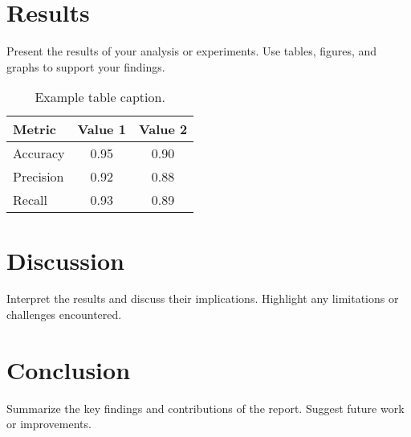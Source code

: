 \documentclass[a4paper,12pt]{article}
\begin{document}
\begin{table}[h!]
\centering
{}
\caption{Boundary Cases (Confidence Ratio $\approx$ 1)}
\label{tab:boundary_predictions}
\end{table}
    
\newpage

\section{Results}
Present the results of your analysis or experiments. Use tables, figures, and graphs to support your findings.

\begin{table}[H]
    \centering
    \begin{tabular}{lcc}
        \toprule
        Metric & Value 1 & Value 2 \\
        \midrule
        Accuracy & 0.95 & 0.90 \\
        Precision & 0.92 & 0.88 \\
        Recall & 0.93 & 0.89 \\
        \bottomrule
    \end{tabular}
    \caption{Example table caption.}
    \label{tab:example}
\end{table}

\section{Discussion}
Interpret the results and discuss their implications. Highlight any limitations or challenges encountered.

\section{Conclusion}
Summarize the key findings and contributions of the report. Suggest future work or improvements.
\end{document}
